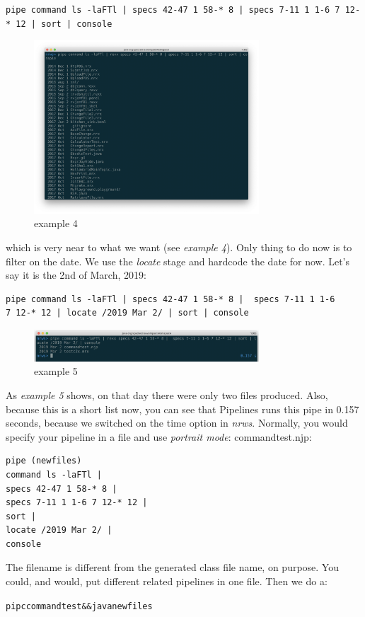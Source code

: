\begin{lstlisting}
pipe command ls -laFTl | specs 42-47 1 58-* 8 | specs 7-11 1 1-6 7 12-* 12 | sort | console
\end{lstlisting}
\begin{figure}[h]
  \includegraphics[width=0.75\textwidth]{images/example4.png}
  \caption{example 4}
  \label{fig:example4}
\end{figure}
which is very near to what we want (see \emph{example 4}). Only thing to do now is to filter
on the date. We use the \emph{locate} stage and hardcode the date for
now. Let's say it is the 2nd of March, 2019:
\begin{lstlisting}
pipe command ls -laFTl | specs 42-47 1 58-* 8 |  specs 7-11 1 1-6
7 12-* 12 | locate /2019 Mar 2/ | sort | console
\end{lstlisting}
\begin{figure}[h]
  \includegraphics[width=0.75\textwidth]{images/example5.png}
  \caption{example 5}
  \label{fig:example5}
\end{figure}
As \emph{example 5} shows, on that day there were only two files
produced. Also, because this is a short list now, you can see that
Pipelines runs this pipe in 0.157 seconds, because we switched on the
time option in \emph{nrws}.
Normally, you would specify your pipeline in a file and use
\emph{portrait mode}:
commandtest.njp:
\begin{lstlisting}
pipe (newfiles)
command ls -laFTl |
specs 42-47 1 58-* 8 |
specs 7-11 1 1-6 7 12-* 12 |
sort |
locate /2019 Mar 2/ |
console
\end{lstlisting}
The filename is different from the generated class file name, on purpose. You could, and would, put different related pipelines in one file.
Then we do a:
\begin{alltt}
pipc commandtest && java newfiles
\end{alltt}

